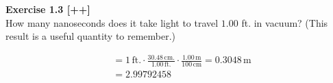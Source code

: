 \begin{examplebox}
\textbf{Exercise 1.3 [++]}\\
How many nanoseconds does it take light to travel $1.00$ ft. in vacuum? (This result is a useful quantity to remember.)
\begin{mathbox}
\begin{align*}
&= 1\, \text{ft.} \cdot \frac{30.48\, \text{cm.}}{1.00\, \text{ft.}} \cdot \frac{1.00\, \text{m}}{100\, \text{cm}} = 0.3048\, \text{m}\\
&= 2.99792458 
\end{align*}
\end{mathbox}
\end{examplebox} 